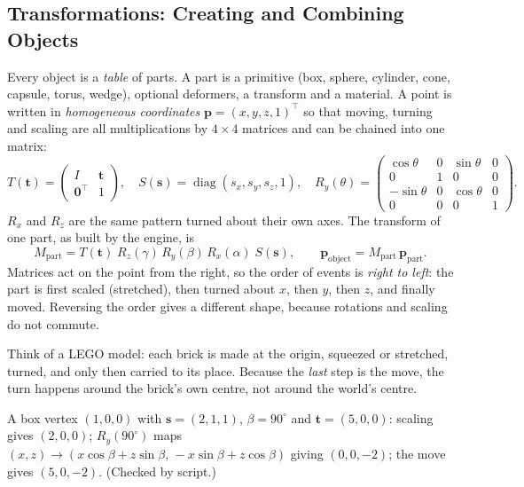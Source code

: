 \documentclass[12pt,a4paper,oneside]{report}
\begin{document}
\subsection{Transformations: Creating and Combining Objects}
Every object is a \emph{table} of parts. A part is a primitive (box, sphere, cylinder, cone, capsule, torus, wedge), optional deformers, a transform and a material. A point is written in \emph{homogeneous coordinates} $\mathbf p=(x,y,z,1)^{\!\top}$ so that moving, turning and scaling are all multiplications by $4\times4$ matrices and can be chained into one matrix:
\begin{equation}T(\mathbf t)=\begin{pmatrix}I&\mathbf t\\ \mathbf 0^{\top}&1\end{pmatrix},\quad S(\mathbf s)=\operatorname{diag}(s_x,s_y,s_z,1),\quad R_y(\theta)=\begin{pmatrix}\cos\theta&0&\sin\theta&0\\0&1&0&0\\-\sin\theta&0&\cos\theta&0\\0&0&0&1\end{pmatrix}.\end{equation}
$R_x$ and $R_z$ are the same pattern turned about their own axes. The transform of one part, as built by the engine, is
\begin{equation}M_{\text{part}}=T(\mathbf t)\;R_z(\gamma)\,R_y(\beta)\,R_x(\alpha)\;S(\mathbf s),\qquad \mathbf p_{\text{object}}=M_{\text{part}}\,\mathbf p_{\text{part}}.\end{equation}
Matrices act on the point from the right, so the order of events is \emph{right to left}: the part is first scaled (stretched), then turned about $x$, then $y$, then $z$, and finally moved. Reversing the order gives a different shape, because rotations and scaling do not commute.

\begin{plain}
Think of a LEGO model: each brick is made at the origin, squeezed or stretched, turned, and only then carried to its place. Because the \emph{last} step is the move, the turn happens around the brick's own centre, not around the world's centre.
\end{plain}

\begin{ex}A box vertex $(1,0,0)$ with $\mathbf s=(2,1,1)$, $\beta=90^{\circ}$ and $\mathbf t=(5,0,0)$: scaling gives $(2,0,0)$; $R_y(90^{\circ})$ maps $(x,z)\to(x\cos\beta+z\sin\beta,\,-x\sin\beta+z\cos\beta)$ giving $(0,0,-2)$; the move gives $(5,0,-2)$. (Checked by script.)\end{ex}
\end{document}
